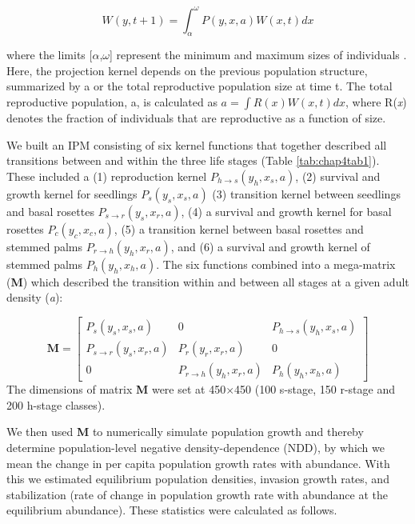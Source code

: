 \documentclass[b5paper,justified]{tufte-book} %
\begin{document}
\begin{fullwidth}
\begin{equation}
W(y,t+1) = \int_{\alpha}^{\omega} P(y,x,a)W(x,t)dx 
\end{equation}
	
where the limits [$\alpha$,$\omega$] represent the minimum and maximum sizes of individuals . Here, the projection kernel depends on the previous population structure, summarized by a or the total reproductive population size at time t. The total reproductive population, a,  is calculated as $a=\int R(x)W(x,t)dx$, where R(\emph{x}) denotes the fraction of individuals that are reproductive as a function of size. 	

We built an IPM consisting of six kernel functions that together described all transitions between and within the three life stages (Table \ref{tab:chap4tab1}). These included a (1) reproduction kernel $P_{h \rightarrow s}(y_h, x_s, a)$, (2) survival and growth kernel for seedlings $P_s(y_s,x_s, a)$ (3) transition kernel between seedlings and basal rosettes $P_{s\rightarrow r}(y_s,x_r, a)$, (4) a survival and growth kernel for basal rosettes $P_c(y_c,x_c, a)$,  (5) a transition kernel between basal rosettes and stemmed palms $P_{r\rightarrow h} (y_h, x_r, a)$, and (6) a survival and growth kernel of stemmed palms $P_h (y_h,x_h, a)$. The six functions combined into a mega-matrix (\textbf{M}) which described the transition within and between all stages at a given adult density (\emph{a}): 

\begin{equation}
\textbf{M}=
  \begin{bmatrix}
    P_s(y_s,x_s, a) & 0 & P_{h \rightarrow s}(y_h, x_s, a) \\
    P_{s\rightarrow r}(y_s,x_r, a) & P_r(y_r,x_r, a) & 0 \\
    0 & P_{r\rightarrow h} (y_h, x_r, a) & P_h (y_h,x_h, a)
  \end{bmatrix}
  \label{eq:chap4eq2}
\end{equation}
The dimensions of matrix \textbf{M} were set at 450$\times$450 (100 s-stage, 150 r-stage and 200 h-stage classes).  

We then used \textbf{M} to numerically simulate population growth and thereby determine population-level negative density-dependence (NDD), by which we mean the change in per capita population growth rates with abundance.  With this we estimated equilibrium population densities, invasion growth rates, and stabilization (rate of change in population growth rate with abundance at the equilibrium abundance). These statistics were calculated as follows.



\end{fullwidth}
\end{document}

